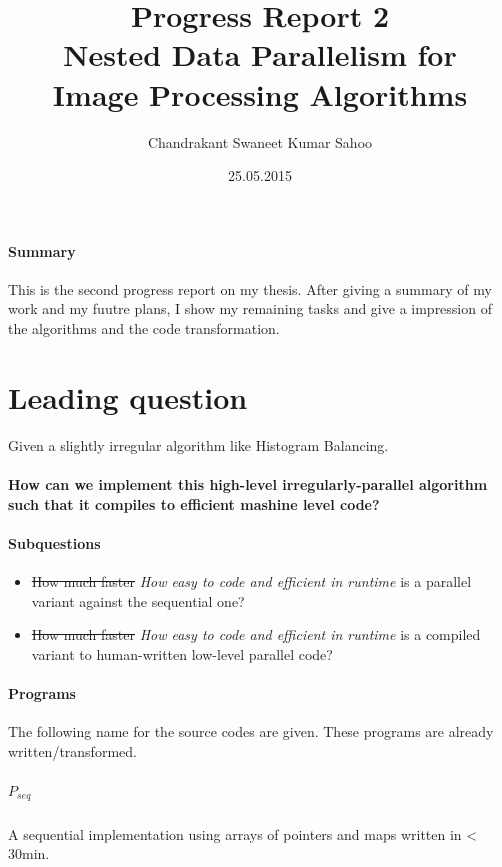 \documentclass{article}
\title{
    Progress Report 2 \\[7pt]
    \large Nested Data Parallelism for\\ Image Processing Algorithms
}
\date{25.05.2015}
\author{Chandrakant Swaneet Kumar Sahoo}
\newcommand{\seq}[0]{$P_{seq}$}
\newcommand{\algo}[0]{Histogram Balancing}
\begin{document}
  
  \maketitle
  
  \paragraph{Summary}
    This is the second progress report on my thesis. After giving a summary of my
    work and my fuutre plans, I show my remaining tasks and give a
    impression of the algorithms and the code transformation.
  
  \newpage
  
  \tableofcontents
  
  \newpage
  
  \section{Leading question}
  Given a slightly irregular algorithm like \algo.
  \paragraph{How can we implement this high-level irregularly-parallel algorithm such that it compiles to efficient mashine level code?}
  \paragraph{Subquestions}
      \begin{itemize}
      \item \sout{How much faster} \emph{How easy to code and efficient in runtime} is a parallel variant against the sequential one?
      \item \sout{How much faster} \emph{How easy to code and efficient in runtime} is a compiled variant to human-written low-level parallel code?
      \end{itemize}
  
  \paragraph{Programs}
    The following name for the source codes are given. These programs are already written/transformed.
    
    \subparagraph{\seq}
       A sequential implementation using arrays of pointers and maps written in < 30min.
        
\end{document}
